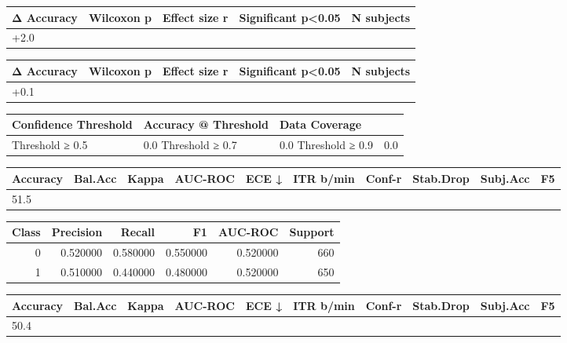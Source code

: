 \begin{tabular}{lrrll}
\toprule
Δ Accuracy & Wilcoxon p & Effect size r & Significant p<0.05 & N subjects \\
\midrule
+2.0%
\bottomrule
\end{tabular}


\begin{tabular}{lrrll}
\toprule
Δ Accuracy & Wilcoxon p & Effect size r & Significant p<0.05 & N subjects \\
\midrule
+0.1%
\bottomrule
\end{tabular}


\begin{tabular}{lll}
\toprule
Confidence Threshold & Accuracy @ Threshold & Data Coverage \\
\midrule
Threshold ≥ 0.5 & 0.0%
Threshold ≥ 0.7 & 0.0%
Threshold ≥ 0.9 & 0.0%
\bottomrule
\end{tabular}


\begin{tabular}{llrrrrrlll}
\toprule
Accuracy & Bal.Acc & Kappa & AUC-ROC & ECE ↓ & ITR b/min & Conf-r & Stab.Drop & Subj.Acc & F5 \\
\midrule
51.5%
\bottomrule
\end{tabular}


\begin{tabular}{rrrrrr}
\toprule
Class & Precision & Recall & F1 & AUC-ROC & Support \\
\midrule
0 & 0.520000 & 0.580000 & 0.550000 & 0.520000 & 660 \\
1 & 0.510000 & 0.440000 & 0.480000 & 0.520000 & 650 \\
\bottomrule
\end{tabular}


\begin{tabular}{llrrrrrlll}
\toprule
Accuracy & Bal.Acc & Kappa & AUC-ROC & ECE ↓ & ITR b/min & Conf-r & Stab.Drop & Subj.Acc & F5 \\
\midrule
50.4%
\bottomrule
\end{tabular}


